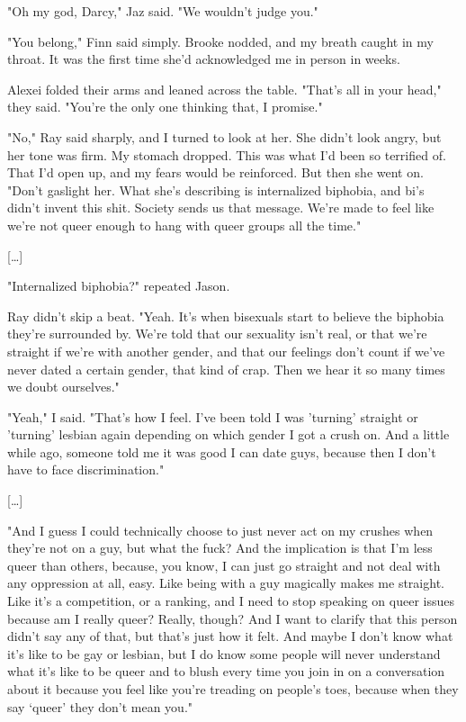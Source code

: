 \documentclass[10pt,a4paper]{article}
\begin{document}
"Oh my god, Darcy," Jaz said. "We wouldn’t judge you."

"You belong," Finn said simply. Brooke nodded, and my breath caught in my throat. It was the first time she'd acknowledged me in person in weeks.

Alexei folded their arms and leaned across the table. "That's all in your head," they said. "You're the only one thinking that, I promise."

"No," Ray said sharply, and I turned to look at her. She didn't look angry, but her tone was firm. My stomach dropped. This was what I'd been so terrified of. That I'd open up, and my fears would be reinforced. But then she went on. "Don't gaslight her. What she's describing is internalized biphobia, and bi's didn't invent this shit. Society sends us that message. We're made to feel like we're not queer enough to hang with queer groups all the time."

[\ldots]

"Internalized biphobia?" repeated Jason.

Ray didn't skip a beat. "Yeah. It's when bisexuals start to believe the biphobia they're surrounded by. We're told that our sexuality isn't real, or that we're straight if we're with another gender, and that our feelings don't count if we've never dated a certain gender, that kind of crap. Then we hear it so many times we doubt ourselves."

"Yeah," I said. "That's how I feel. I've been told I was 'turning' straight or 'turning' lesbian again depending on which gender I got a crush on. And a little while ago, someone told me it was good I can date guys, because then I don't have to face discrimination."

[\ldots]

"And I guess I could technically choose to just never act on my crushes when they're not on a guy, but what the fuck? And the implication is that I'm less queer than others, because, you know, I can just go straight and not deal with any oppression at all, easy. Like being with a guy magically makes me straight. Like it's a competition, or a ranking, and I need to stop speaking on queer issues because am I really queer? Really, though? And I want to clarify that this person didn't say any of that, but that's just how it felt. And maybe I don't know what it's like to be gay or lesbian, but I do know some people will never understand what it's like to be queer and to blush every time you join in on a conversation about it because you feel like you're treading on people's toes, because when they say `queer' they don't mean you."
\end{document}
